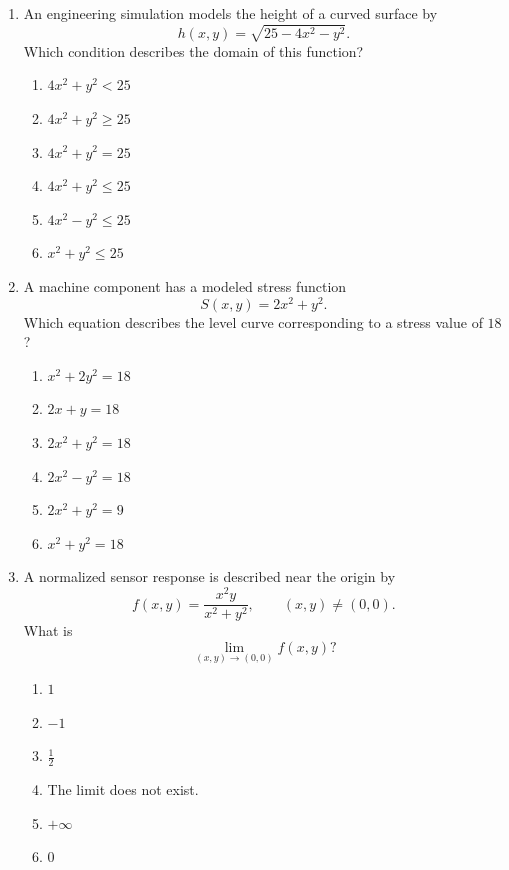 \documentclass[a4paper,12pt]{article}
\theoremstyle{mystyle}
\numberwithin{equation}{section}
\numberwithin{theorem}{section}
\numberwithin{proposition}{section}
\numberwithin{example}{section}
\numberwithin{remark}{section}
\numberwithin{lemma}{section}
\numberwithin{corollary}{section}
\numberwithin{definition}{section}
\begin{document}
\begin{enumerate}

\item An engineering simulation models the height of a curved surface by
\[
    h(x,y)=\sqrt{25-4x^2-y^2}.
\]
Which condition describes the domain of this function?
\begin{enumerate}
    \item $4x^2+y^2<25$
    \item $4x^2+y^2\geq25$
    \item $4x^2+y^2=25$
    \item $4x^2+y^2\leq25$
    \item $4x^2-y^2\leq25$
    \item $x^2+y^2\leq25$
\end{enumerate}

\item A machine component has a modeled stress function
\[
    S(x,y)=2x^2+y^2.
\]
Which equation describes the level curve corresponding to a stress
value of $18$?
\begin{enumerate}
    \item $x^2+2y^2=18$
    \item $2x+y=18$
    \item $2x^2+y^2=18$
    \item $2x^2-y^2=18$
    \item $2x^2+y^2=9$
    \item $x^2+y^2=18$
\end{enumerate}

\item A normalized sensor response is described near the origin by
\[
    f(x,y)=\frac{x^2y}{x^2+y^2},
    \qquad (x,y)\neq(0,0).
\]
What is
\[
    \lim_{(x,y)\to(0,0)}f(x,y)?
\]
\begin{enumerate}
    \item $1$
    \item $-1$
    \item $\frac12$
    \item The limit does not exist.
    \item $+\infty$
    \item $0$
\end{enumerate}


\end{enumerate}
\end{document}
